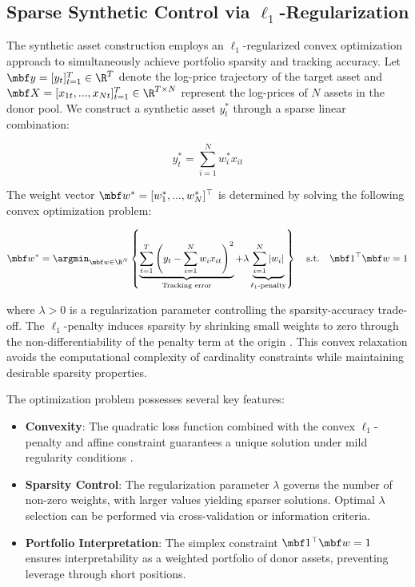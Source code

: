 \subsection{Sparse Synthetic Control via $\ell_1$-Regularization}

The synthetic asset construction employs an $\ell_1$-regularized convex optimization approach to simultaneously achieve portfolio sparsity and tracking accuracy. Let $\mbf y = [y_{t}]_{t=1}^T\in \R^{T}$ denote the log-price trajectory of the target asset and $\mbf X = [x_{1t}, ..., x_{Nt}]_{t=1}^T\in\R^{T\times N}$ represent the log-prices of $N$ assets in the donor pool. We construct a synthetic asset ${y}^*_t$ through a sparse linear combination:

\begin{equation*}
{y}^*_t = \sum_{i=1}^N w^*_i x_{it}
\end{equation*}

The weight vector $\mbf w^* = [w^*_1, ..., w^*_N]^\top$ is determined by solving the following convex optimization problem:

\begin{equation}
\mbf w^* = \argmin_{\mbf w \in \R^N} \left\{ \underbrace{\sum_{t=1}^T \left(y_t - \sum_{i=1}^N w_i x_{it}\right)^2}_{\text{Tracking error}} + \lambda \underbrace{\sum_{i=1}^N |w_i|}_{\ell_1\text{-penalty}} \right\} \quad \text{s.t.} \quad \mbf 1^\top \mbf w = 1
\end{equation}

where $\lambda > 0$ is a regularization parameter controlling the sparsity-accuracy trade-off. The $\ell_1$-penalty induces sparsity by shrinking small weights to zero through the non-differentiability of the penalty term at the origin \cite{tibshirani1996regression}. This convex relaxation avoids the computational complexity of cardinality constraints while maintaining desirable sparsity properties.

The optimization problem possesses several key features:

\begin{itemize}
\item \textbf{Convexity}: The quadratic loss function combined with the convex $\ell_1$-penalty and affine constraint guarantees a unique solution under mild regularity conditions \cite{boyd2004convex}.

\item \textbf{Sparsity Control}: The regularization parameter $\lambda$ governs the number of non-zero weights, with larger values yielding sparser solutions. Optimal $\lambda$ selection can be performed via cross-validation or information criteria.

\item \textbf{Portfolio Interpretation}: The simplex constraint $\mbf 1^\top \mbf w = 1$ ensures interpretability as a weighted portfolio of donor assets, preventing leverage through short positions.
\end{itemize}

